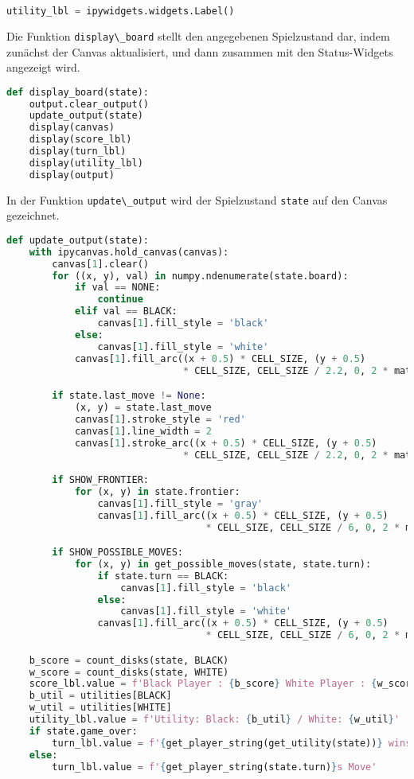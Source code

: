 \begin{lstlisting}[language=Python]
utility_lbl = ipywidgets.widgets.Label()
\end{lstlisting}

Die Funktion \passthrough{\lstinline!display\_board!} stellt den
angegebenen Spielzustand dar, indem zunächst der Canvas aktualisiert,
und dann zusammen mit den Status-Widgets angezeigt wird.

\begin{lstlisting}[language=Python]
def display_board(state):
    output.clear_output()
    update_output(state)
    display(canvas)
    display(score_lbl)
    display(turn_lbl)
    display(utility_lbl)
    display(output)
\end{lstlisting}

In der Funktion \passthrough{\lstinline!update\_output!} wird der
Spielzustand \passthrough{\lstinline!state!} auf den Canvas gezeichnet.

\begin{lstlisting}[language=Python]
def update_output(state):
    with ipycanvas.hold_canvas(canvas):
        canvas[1].clear()
        for ((x, y), val) in numpy.ndenumerate(state.board):
            if val == NONE:
                continue
            elif val == BLACK:
                canvas[1].fill_style = 'black'
            else:
                canvas[1].fill_style = 'white'
            canvas[1].fill_arc((x + 0.5) * CELL_SIZE, (y + 0.5)
                               * CELL_SIZE, CELL_SIZE / 2.2, 0, 2 * math.pi)

        if state.last_move != None:
            (x, y) = state.last_move
            canvas[1].stroke_style = 'red'
            canvas[1].line_width = 2
            canvas[1].stroke_arc((x + 0.5) * CELL_SIZE, (y + 0.5)
                               * CELL_SIZE, CELL_SIZE / 2.2, 0, 2 * math.pi)

        if SHOW_FRONTIER:
            for (x, y) in state.frontier:
                canvas[1].fill_style = 'gray'
                canvas[1].fill_arc((x + 0.5) * CELL_SIZE, (y + 0.5)
                                   * CELL_SIZE, CELL_SIZE / 6, 0, 2 * math.pi)

        if SHOW_POSSIBLE_MOVES:
            for (x, y) in get_possible_moves(state, state.turn):
                if state.turn == BLACK:
                    canvas[1].fill_style = 'black'
                else:
                    canvas[1].fill_style = 'white'
                canvas[1].fill_arc((x + 0.5) * CELL_SIZE, (y + 0.5)
                                   * CELL_SIZE, CELL_SIZE / 6, 0, 2 * math.pi)

    b_score = count_disks(state, BLACK)
    w_score = count_disks(state, WHITE)
    score_lbl.value = f'Black Player : {b_score} White Player : {w_score}'
    b_util = utilities[BLACK]
    w_util = utilities[WHITE]
    utility_lbl.value = f'Utility: Black: {b_util} / White: {w_util}'
    if state.game_over:
        turn_lbl.value = f'{get_player_string(get_utility(state))} wins'
    else:
        turn_lbl.value = f'{get_player_string(state.turn)}s Move'
\end{lstlisting}


